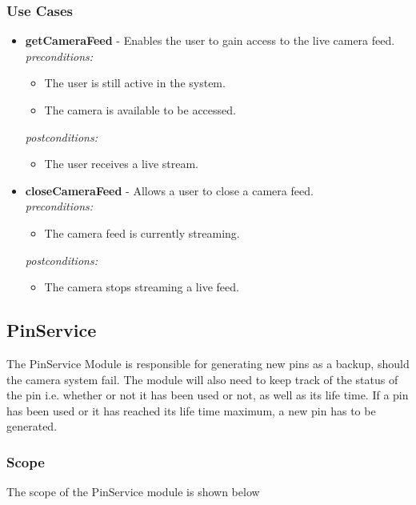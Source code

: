 \documentclass[a4paper,12pt]{article}
\begin{document}
	\newpage
	\subsubsection{Use Cases}
	
	\begin{itemize}
		\item \textbf{getCameraFeed} - Enables the user to gain access to the live camera feed.\\[0.5cm]
		\textit{preconditions:}
		\begin{itemize}
			\item The user is still active in the system.
			\item The camera is available to be accessed.
		\end{itemize}
		
		\textit{postconditions:}
		\begin{itemize}
			\item The user receives a live stream.\\[0.5cm]
		\end{itemize}
		
		\item \textbf{closeCameraFeed} - Allows a user to close a camera feed.\\[0.5cm]
		\textit{preconditions:}
		\begin{itemize}
			\item The camera feed is currently streaming.
		\end{itemize}
		
		\textit{postconditions:}
		\begin{itemize}
			\item The camera stops streaming a live feed.\\[0.5cm]
		\end{itemize}
	\end{itemize}
	
	\newpage
	\subsection{PinService}
	The PinService Module is responsible for generating new pins as a backup, should the camera system fail. The module will also need to keep track of the status of the pin i.e. whether or not it has been used or not, as well as its life time. If a pin has been used or it has reached its life time maximum, a new pin has to be generated.
	
	\subsubsection{Scope}
	The scope of the PinService module is shown below
	
\end{document}
